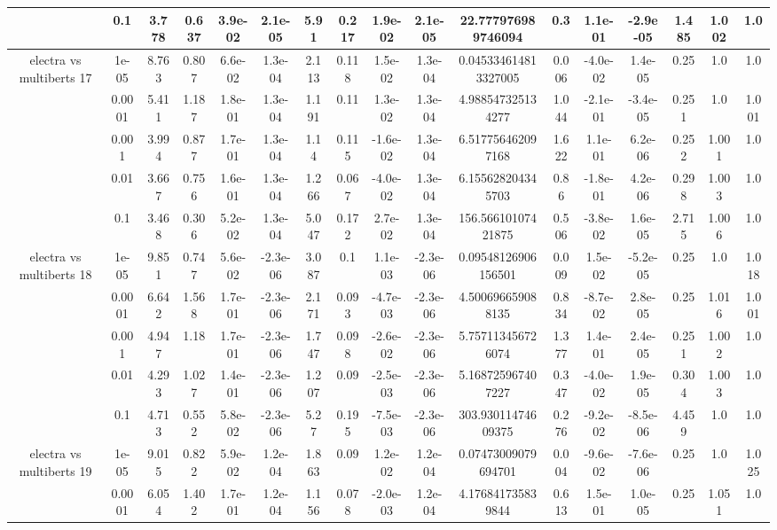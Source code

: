 \begin{tabular}{|c|c|c|c|c|c|c|c|c|c|c|c|c|c|c|c|c|}
 & 0.1 & 3.778 & 0.637 & 3.9e-02 & 2.1e-05 & 5.91 & 0.217 & 1.9e-02 & 2.1e-05 & 22.777976989746094 & 0.3 & 1.1e-01 & -2.9e-05 & 1.485 & 1.002 & 1.0 \\
\hline
\multirow{5}{*}{electra  vs multiberts 17} & 1e-05 & 8.763 & 0.807 & 6.6e-02 & 1.3e-04 & 2.113 & 0.118 & 1.5e-02 & 1.3e-04 & 0.045334614813327005 & 0.006 & -4.0e-02 & 1.4e-05 & 0.25 & 1.0 & 1.0 \\
 & 0.0001 & 5.411 & 1.187 & 1.8e-01 & 1.3e-04 & 1.191 & 0.11 & 1.3e-02 & 1.3e-04 & 4.988547325134277 & 1.044 & -2.1e-01 & -3.4e-05 & 0.251 & 1.0 & 1.001 \\
 & 0.001 & 3.994 & 0.877 & 1.7e-01 & 1.3e-04 & 1.14 & 0.115 & -1.6e-02 & 1.3e-04 & 6.517756462097168 & 1.622 & 1.1e-01 & 6.2e-06 & 0.252 & 1.001 & 1.0 \\
 & 0.01 & 3.667 & 0.756 & 1.6e-01 & 1.3e-04 & 1.266 & 0.067 & -4.0e-02 & 1.3e-04 & 6.155628204345703 & 0.86 & -1.8e-01 & 4.2e-06 & 0.298 & 1.003 & 1.0 \\
 & 0.1 & 3.468 & 0.306 & 5.2e-02 & 1.3e-04 & 5.047 & 0.172 & 2.7e-02 & 1.3e-04 & 156.56610107421875 & 0.506 & -3.8e-02 & 1.6e-05 & 2.715 & 1.006 & 1.0 \\
\hline
\multirow{5}{*}{electra  vs multiberts 18} & 1e-05 & 9.851 & 0.747 & 5.6e-02 & -2.3e-06 & 3.087 & 0.1 & 1.1e-03 & -2.3e-06 & 0.09548126906156501 & 0.009 & 1.5e-02 & -5.2e-05 & 0.25 & 1.0 & 1.018 \\
 & 0.0001 & 6.642 & 1.568 & 1.7e-01 & -2.3e-06 & 2.171 & 0.093 & -4.7e-03 & -2.3e-06 & 4.500696659088135 & 0.834 & -8.7e-02 & 2.8e-05 & 0.25 & 1.016 & 1.001 \\
 & 0.001 & 4.947 & 1.18 & 1.7e-01 & -2.3e-06 & 1.747 & 0.098 & -2.6e-02 & -2.3e-06 & 5.757113456726074 & 1.377 & 1.4e-01 & 2.4e-05 & 0.251 & 1.002 & 1.0 \\
 & 0.01 & 4.293 & 1.027 & 1.4e-01 & -2.3e-06 & 1.207 & 0.09 & -2.5e-03 & -2.3e-06 & 5.168725967407227 & 0.347 & -4.0e-02 & 1.9e-05 & 0.304 & 1.003 & 1.0 \\
 & 0.1 & 4.713 & 0.552 & 5.8e-02 & -2.3e-06 & 5.27 & 0.195 & -7.5e-03 & -2.3e-06 & 303.93011474609375 & 0.276 & -9.2e-02 & -8.5e-06 & 4.459 & 1.0 & 1.0 \\
\hline
\multirow{5}{*}{electra  vs multiberts 19} & 1e-05 & 9.015 & 0.822 & 5.9e-02 & 1.2e-04 & 1.863 & 0.09 & 1.2e-02 & 1.2e-04 & 0.07473009079694701 & 0.004 & -9.6e-02 & -7.6e-06 & 0.25 & 1.0 & 1.025 \\
 & 0.0001 & 6.054 & 1.402 & 1.7e-01 & 1.2e-04 & 1.156 & 0.078 & -2.0e-03 & 1.2e-04 & 4.176841735839844 & 0.613 & 1.5e-01 & 1.0e-05 & 0.25 & 1.051 & 1.0 \\

\end{tabular}
